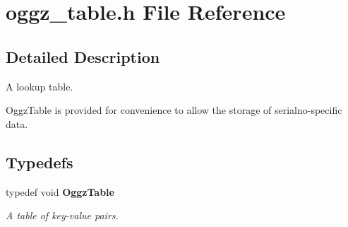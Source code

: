\section{oggz\_\-table.h File Reference}
\label{oggz__table_8h}


\subsection{Detailed Description}
A lookup table. 

Oggz\-Table is provided for convenience to allow the storage of serialno-specific data.

\subsection*{Typedefs}
\begin{CompactItemize}
\item 
typedef void {\bf Oggz\-Table}\label{oggz__table_8h_a0}

\begin{CompactList}\small\item\em A table of key-value pairs. \item\end{CompactList}\end{CompactItemize}
